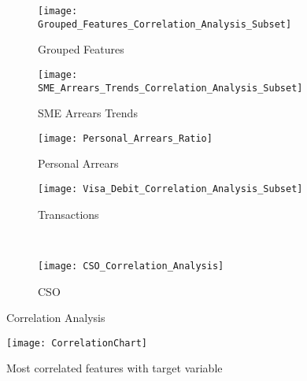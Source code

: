 \begin{figure}[H]
	\centering
	\begin{subfigure}[b]{0.32\textwidth}
		\captionsetup{font=scriptsize}
		\texttt{[image: Grouped\_Features\_Correlation\_Analysis\_Subset]}\caption{Grouped Features}\label{fig:groupedFeaturesCorrelation}
	\end{subfigure} 
	\begin{subfigure}[b]{0.32\textwidth}
		\captionsetup{font=scriptsize}
		\texttt{[image: SME\_Arrears\_Trends\_Correlation\_Analysis\_Subset]}
		\caption{SME Arrears Trends}\label{fig:smeArrearsCorrelation}
	\end{subfigure} 
	\begin{subfigure}[b]{0.32\textwidth}
		\captionsetup{font=scriptsize}
		\texttt{[image: Personal\_Arrears\_Ratio]}
		\caption{Personal Arrears}\label{fig:personalArrearsCorrelation}
	\end{subfigure} 
	\medskip
	\begin{subfigure}[b]{0.32\textwidth}
		\captionsetup{font=scriptsize}
		\texttt{[image: Visa\_Debit\_Correlation\_Analysis\_Subset]}
		\caption{Transactions}\label{fig:transVisaCorrelation}
	\end{subfigure} ~\quad
	\begin{subfigure}[b]{0.32\textwidth}
		\captionsetup{font=scriptsize}
		\texttt{[image: CSO\_Correlation\_Analysis]}
		\caption{CSO}\label{fig:CSOCorrelation}
	\end{subfigure}
	\caption{Correlation Analysis}
	\label{fig:unbal_corr_analysis}
\end{figure}

\begin{figure}[H]
	\texttt{[image: CorrelationChart]}
	\caption{Most correlated features with target variable}
	\label{fig:Correlation Analysis}
\end{figure}


